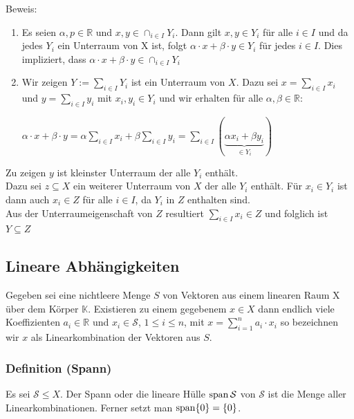 Beweis:
\begin{enumerate}
\item Es seien $\alpha,p\in \mathbb{R}$ und $x,y\in \displaystyle\cap_{i\in I} Y_i$. Dann gilt $x,y \in Y_i$ für alle $i\in I$ und da jedes $Y_i$ ein Unterraum von X ist, folgt $\alpha\cdot x+\beta\cdot y \in Y_i$ für jedes $i\in I$. Dies impliziert, dass $\alpha\cdot x+\beta\cdot y \in \displaystyle\cap_{i\in I} Y_i$
\item Wir zeigen $\displaystyle Y := \sum_{i\in I} Y_i$ ist ein Unterraum von $X$. Dazu sei $\displaystyle x=\sum_{i\in I} x_i$ und $\displaystyle y=\sum_{i\in I} y_i$ mit $x_i,y_i\in Y_i$ und wir erhalten für alle $\alpha,\beta \in \mathbb{R}$:

$\displaystyle\alpha \cdot x+\beta\cdot y=\alpha\sum_{i\in I}x_i+\beta\sum_{i\in I} y_i=\sum_{i\in I}(\underbrace{\alpha x_i+\beta y_i}_{\in Y_i})$
\end{enumerate}
Zu zeigen $y$ ist kleinster Unterraum der alle $Y_i$ enthält.\\
Dazu sei $z\subseteq X$ ein weiterer Unterraum von $X$ der alle $Y_i$ enthält. Für $x_i\in Y_i$ ist dann auch $x_i\in Z$ für alle $i\in I$, da $Y_i$ in $Z$ enthalten sind.\\
Aus der Unterraumeigenschaft von $Z$ resultiert $\displaystyle\sum_{i\in I} x_i \in Z$ und folglich ist $Y\subseteq Z$
\subsection{Lineare Abhängigkeiten}
Gegeben sei eine nichtleere Menge $S$ von Vektoren aus einem linearen Raum X über dem Körper $\mathbb{K}$. Existieren zu einem gegebenem $x\in X$ dann endlich viele Koeffizienten $a_i\in\mathbb{R}$ und $x_i\in\mathcal{S}$, $1\leq i\leq n$, mit $\displaystyle x=\sum^{n}_{i=1} a_i \cdot x_i$  so bezeichnen wir $x$ als Linearkombination der Vektoren aus $S$.
\subsubsection{Definition (Spann)}
Es sei $\mathcal{S} \leq X$. Der Spann oder die lineare Hülle $\operatorname{span}\mathcal{S}$ von $\mathcal{S}$ ist die Menge aller Linearkombinationen. Ferner setzt man $\operatorname{span}\{0\}=\{0\}$.
